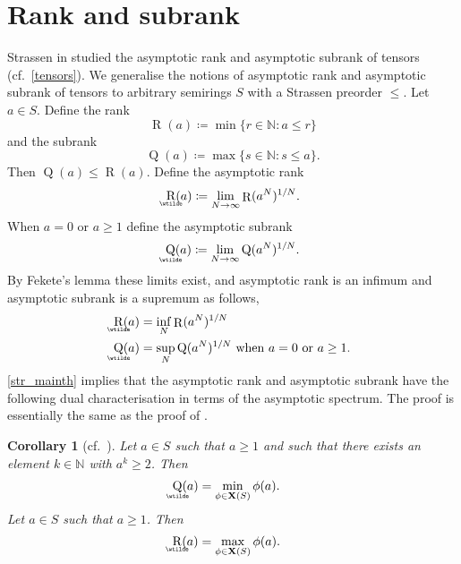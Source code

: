 \documentclass[a4paper, fleqn]{amsart}
\theoremstyle{plain}
\newtheorem{corollary}[theorem]{Corollary}
\theoremstyle{definition}
\DeclareMathOperator{\rank}{R}
\DeclareMathOperator{\subrank}{Q}
\DeclareMathOperator{\asymprank}{\underaccent{\wtilde}{R}}
\DeclareMathOperator{\asympsubrank}{\underaccent{\wtilde}{Q}}
\newcommand{\NN}{\mathbb{N}}
\newcommand{\jeroen}[1]{#1}
\newcommand{\defin}[1]{#1}
\let\leqx\leqslant
\let\geqx\geqslant
\newcommand{\aspec}{\mathbf{X}}
\let\leqx\leqslant
\let\geqx\geqslant
\begin{document}
\section{Rank and subrank}\label{str_sec:rank}
Strassen in \cite{strassen1988asymptotic} studied the asymptotic rank and asymptotic subrank of tensors (cf.~\cref{tensors}).
We generalise the notions of asymptotic rank and asymptotic subrank of tensors to arbitrary semirings $S$ with a Strassen preorder $\leqx$.
Let $a \in S$. %
Define the \defin{rank} 
\[
\rank(a) \coloneqq \min \{ r \in \NN : a \leqx r\}
\]
%
%
%
and the \defin{subrank} 
\[
\subrank(a) \coloneqq \max\{ s \in \NN : s \leqx a\}.
\]
Then $\subrank(a) \leq \rank(a)$. %
%
%
Define the \defin{asymptotic rank}
\begin{equation*}\label{str_asympr}
\asymprank(a) \coloneqq \lim_{N \to \infty} \rank(a^N)^{1/N}.
\end{equation*}
When $a = 0$ or $a\geq1$ define the \defin{asymptotic subrank}
\begin{equation*}\label{str_asymps}
\asympsubrank(a) \coloneqq \lim_{N \to \infty} \subrank(a^N)^{1/N}.
\end{equation*}
%
%
%
%
%
%
%
%
%
%
%
%
%
%
%
%
%
%
%
By Fekete's lemma these limits exist, and
asymptotic rank is an infimum and asymptotic subrank is a supremum as follows,
%
%
\begin{align*}
\asymprank(a) &= \inf_N \rank(a^N)^{1/N}\\
\asympsubrank(a) &= \sup_N \subrank(a^N)^{1/N} \textnormal{ when $a = 0$ or $a\geq1$}.
\end{align*}
%
%
%
%
%
%
%
%
%
%
%
%
%
%
%
%
%
%
%
%
%
%
%
\cref{str_mainth} implies that the asymptotic rank and asymptotic subrank have the following dual characterisation in terms of the asymptotic spectrum. %
The proof is essentially the same as the proof of \cite[Th.~3.8]{strassen1988asymptotic}. %

\begin{corollary}[cf.~{\cite[Th.~3.8]{strassen1988asymptotic}}]\label{Qmin}\label{str_rankthm}
\jeroen{Let $a \in S$ such that %
$a\geqx 1$ and such that there exists an element $k\in \NN$ with $a^k \geqx 2$.} Then
\begin{align*}
\asympsubrank(a) &= \min_{\phi \in \aspec(S)} \phi(a).
\end{align*}
\jeroen{Let $a \in S$ such that $a \geqx 1$. Then}
\begin{align*}
\asymprank(a) &= \max_{\phi \in \aspec(S)} \phi(a).
\end{align*}
\end{corollary}
\end{document}
